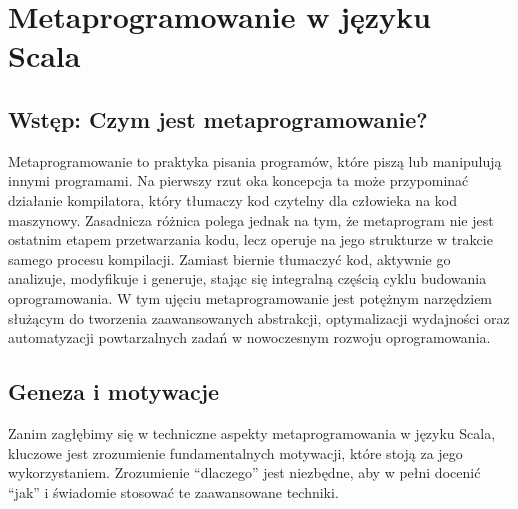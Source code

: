 \chapter{Metaprogramowanie w języku Scala}
\label{ch:metaprogramowanie}


\section{Wstęp: Czym jest metaprogramowanie?}
Metaprogramowanie to praktyka pisania programów, które piszą lub manipulują innymi programami.
Na pierwszy rzut oka koncepcja ta może przypominać działanie kompilatora, który tłumaczy kod czytelny dla człowieka na kod maszynowy.
Zasadnicza różnica polega jednak na tym, że metaprogram nie jest ostatnim etapem przetwarzania kodu, lecz operuje na jego strukturze w trakcie samego procesu kompilacji.
Zamiast biernie tłumaczyć kod, aktywnie go analizuje, modyfikuje i generuje, stając się integralną częścią cyklu budowania oprogramowania.
W tym ujęciu metaprogramowanie jest potężnym narzędziem służącym do tworzenia zaawansowanych abstrakcji, optymalizacji wydajności oraz automatyzacji powtarzalnych zadań w nowoczesnym rozwoju oprogramowania.


\section{Geneza i motywacje}
Zanim zagłębimy się w techniczne aspekty metaprogramowania w języku Scala, kluczowe jest zrozumienie fundamentalnych motywacji, które stoją za jego wykorzystaniem.
Zrozumienie \enquote{dlaczego} jest niezbędne, aby w pełni docenić \enquote{jak} i świadomie stosować te zaawansowane techniki.

